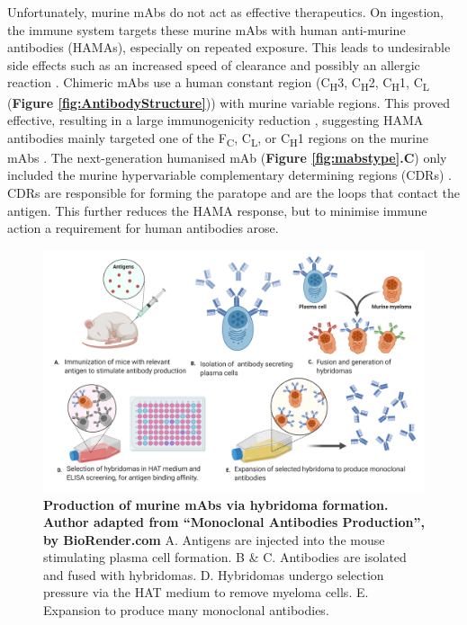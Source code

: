 Unfortunately, murine mAbs do not act as effective therapeutics. On ingestion, the immune system targets these murine mAbs with human anti-murine antibodies (HAMAs), especially on repeated exposure. This leads to undesirable side effects such as an increased speed of clearance and possibly an allergic reaction \cite{hosonoHumanMouseChimeric1992,legouffeHumanAntimouseAntibody1994}. Chimeric mAbs use a human constant region (C\textsubscript{H}3, C\textsubscript{H}2,  C\textsubscript{H}1, C\textsubscript{L} (\textbf{Figure \ref{fig:AntibodyStructure}})) with murine variable regions. This proved effective, resulting in a large immunogenicity reduction \cite{hwangImmunogenicityEngineeredAntibodies2005}, suggesting HAMA antibodies mainly targeted one of the F\textsubscript{C}, C\textsubscript{L}, or C\textsubscript{H}1 regions on the murine mAbs \cite{hosonoHumanMouseChimeric1992}. The next-generation humanised mAb (\textbf{Figure \ref{fig:mabstype}.C}) only included the murine hypervariable complementary determining regions (CDRs) \cite{hardingImmunogenicityHumanizedFully2010}. CDRs are responsible for forming the paratope and are the loops that contact the antigen. This further reduces the HAMA response, but to minimise immune action a requirement for human antibodies arose.
\begin{figure}
    \centering
    \includegraphics[width=0.9\linewidth]{./images/mabsproduction.png}
    \caption{\textbf{Production of murine mAbs via hybridoma formation. Author adapted from “Monoclonal Antibodies Production”, by BioRender.com} A. Antigens are injected into the mouse stimulating plasma cell formation. B \& C. Antibodies are isolated and fused with hybridomas. D. Hybridomas undergo selection pressure via the HAT medium to remove myeloma cells. E. Expansion to produce many monoclonal antibodies. } 
    \label{fig:mabsproduction}
\end{figure}

